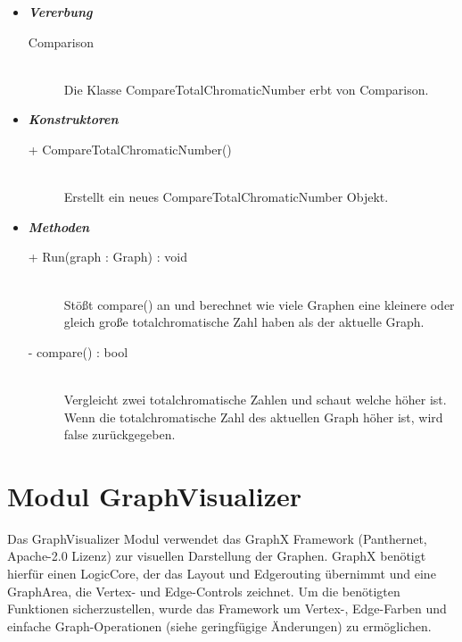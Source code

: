 \documentclass[13pt]{scrreprt}
\begin{document}
\begin{itemize} [label = {$\circ$}]
	\item {\large \textbf{\textit{Vererbung}}\par}
	\begin{description}
		\item[Comparison] \hfill \\Die Klasse CompareTotalChromaticNumber erbt von Comparison.
	\end{description}
	\item {\large \textbf{\textit{Konstruktoren}}\par}
	\begin{description}
		\item[+ CompareTotalChromaticNumber()] \hfill \\Erstellt ein neues CompareTotalChromaticNumber Objekt.
	\end{description}
	\item {\large \textbf{\textit{Methoden}}\par}
	\begin{description}
		\item[+ Run(graph : Graph) : void] \hfill \\Stößt compare() an und berechnet wie viele Graphen eine kleinere oder gleich große totalchromatische Zahl haben als der aktuelle Graph.
		\item[- compare() : bool] \hfill \\Vergleicht zwei totalchromatische Zahlen und schaut welche höher ist. Wenn die totalchromatische Zahl des aktuellen Graph höher ist, wird false zurückgegeben.
	\end{description}
\end{itemize}
	\newpage
\section{Modul GraphVisualizer}
	Das GraphVisualizer Modul verwendet das GraphX Framework (Panthernet, Apache-2.0 Lizenz) zur visuellen Darstellung der Graphen.
	GraphX benötigt hierfür einen LogicCore, der das Layout und Edgerouting übernimmt und eine GraphArea, die Vertex- und Edge-Controls zeichnet.
	Um die benötigten Funktionen sicherzustellen, wurde das Framework um Vertex-, Edge-Farben und einfache Graph-Operationen (siehe geringfügige Änderungen) zu ermöglichen.
	
\end{document}
